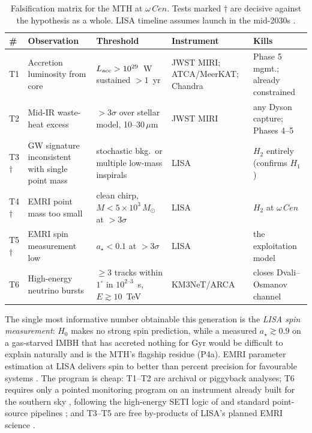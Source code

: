 \documentclass[11pt]{article}
\newcommand{\msun}{M_\odot}
\newcommand{\acen}{\ensuremath{\omega}\,Cen}
\newcommand{\astar}{a_\star}
\begin{document}
\begin{table}[t]
\centering
\caption{Falsification matrix for the MTH at $\acen$. Tests marked $\dagger$ are decisive against the hypothesis as a whole. LISA timeline assumes launch in the mid-2030s \citep{colpi2024}.}
\label{tab:falsification}
\footnotesize
\begin{tabular}{@{}p{0.5cm}p{3.5cm}p{3.6cm}p{2.2cm}p{2.4cm}@{}}
\toprule
\# & Observation & Threshold & Instrument & Kills \\
\midrule
T1 & Accretion luminosity from core & $L_{\rm acc} > 10^{29}$~W sustained ${>}1$~yr & JWST MIRI; ATCA/MeerKAT; Chandra & Phase 5 mgmt.; already constrained \\
T2 & Mid-IR waste-heat excess & ${>}3\sigma$ over stellar model, 10--30\,$\mu$m & JWST MIRI & any Dyson capture; Phases 4--5 \\
T3$\dagger$ & GW signature inconsistent with single point mass & stochastic bkg.\ or multiple low-mass inspirals & LISA & $H_2$ entirely (confirms $H_1$) \\
T4$\dagger$ & EMRI point mass too small & clean chirp, $M < 5\times10^{3}\,\msun$ at ${>}3\sigma$ & LISA & $H_2$ at $\acen$ \\
T5$\dagger$ & EMRI spin measurement low & $\astar < 0.1$ at ${>}3\sigma$ & LISA & the exploitation model \\
T6 & High-energy neutrino bursts & $\ge 3$ tracks within $1^{\circ}$ in $10^{2\text{--}3}$~s, $E \gtrsim 10$~TeV & KM3NeT/ARCA & closes Dvali--Osmanov channel \\
\bottomrule
\end{tabular}
\end{table}

The single most informative number obtainable this generation is the \emph{LISA spin measurement}: $H_0$ makes no strong spin prediction, while a measured $\astar \gtrsim 0.9$ on a gas-starved IMBH that has accreted nothing for Gyr would be difficult to explain naturally and is the MTH's flagship residue (P4a). EMRI parameter estimation at LISA delivers spin to better than percent precision for favourable systems \citep{babak2017,amaroseoane2018}. The program is cheap: T1--T2 are archival or piggyback analyses; T6 requires only a pointed monitoring program on an instrument already built for the southern sky \citep{adrian2016,km3net2025}, following the high-energy SETI logic of \citet{lacki2025} and standard point-source pipelines \citep{icecube2020}; and T3--T5 are free by-products of LISA's planned EMRI science \citep{colpi2024}.
\end{document}
